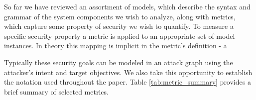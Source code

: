 
So far we have reviewed an assortment of models, which describe the syntax and grammar of the system components we wish to analyze, along with metrics, which capture some property of security we wish to quantify. To measure a specific security property a metric is applied to an appropriate set of model instances. In theory this mapping is implicit in the metric's definition - a 

 Typically these security goals can be modeled in an attack graph using the attacker's intent and target objectives. We also take this opportunity to establish the notation used throughout the paper. Table \ref{tab:metric_summary} provides a brief summary of selected metrics.